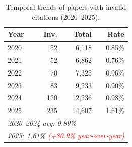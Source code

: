\begin{table}[t]
\centering
\caption{Temporal trends of papers with invalid citations (2020--2025).}
\label{tab:temporal_trends}
\small
{}
\begin{tabular}{lrrr}
\toprule
\textbf{Year} & \textbf{Inv.} & \textbf{Total} & \textbf{Rate} \\
\midrule
2020 & 52 & 6,118 & 0.85\% \\
2021 & 52 & 6,862 & 0.76\% \\
2022 & 70 & 7,325 & 0.96\% \\
2023 & 83 & 9,233 & 0.90\% \\
2024 & 120 & 12,236 & 0.98\% \\
\cellcolor{red!25}2025 & \cellcolor{red!25}235 & \cellcolor{red!25}14,607 & \cellcolor{red!25}1.61\% \\
\midrule
\multicolumn{4}{l}{\textit{2020--2024 avg: 0.89\%}} \\
\multicolumn{4}{l}{\textit{2025: 1.61\% \textcolor{red}{(+80.9\% year-over-year)}}} \\
\bottomrule
\end{tabular}
\end{table}

